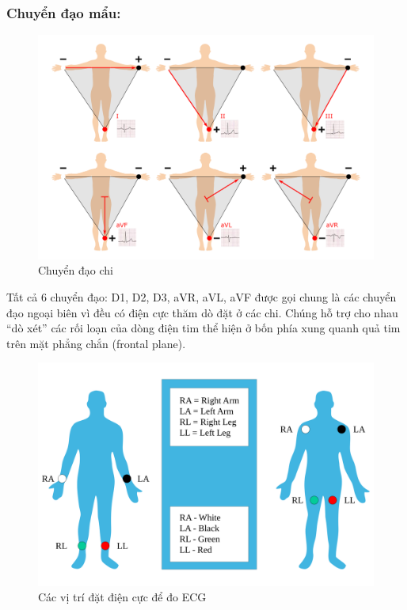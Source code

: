 \subsubsection{Chuyển đạo mẩu:}
\begin{center}
    \begin{figure}[htp]
    \begin{center}
    \includegraphics[scale=.2]{image/week1/chuyendaochi.png}
    \end{center}
    \caption{Chuyển đạo chi \cite{chuyendao}}
    \end{figure}
\end{center}
Tất cả 6 chuyển đạo: D1, D2, D3, aVR, aVL, aVF được gọi chung là các chuyển đạo ngoại biên vì đều có điện cực thăm dò đặt ở các chi. Chúng hỗ trợ cho nhau “dò xét” các rối loạn của dòng điện tim thể hiện ở bốn phía xung quanh quả tim trên mặt phẳng chắn (frontal plane).
\begin{center}
    \begin{figure}[htp]
    \begin{center}
    \includegraphics[scale=.12]{image/chapter1/2000px-Limb_leads.png}
    \end{center}
    \caption{Các vị trí đặt điện cực để đo ECG}
    \end{figure}
\end{center}

